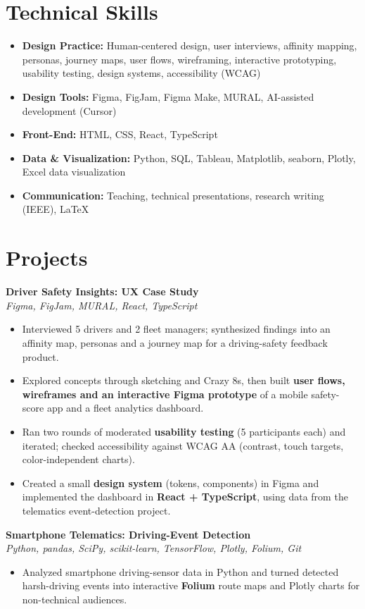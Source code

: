 \documentclass[10pt,letterpaper]{article}
\newcommand{\project}[2]{\textbf{#1}\\\textit{#2}\par}
\begin{document}
\section*{Technical Skills}
\begin{itemize}\item \textbf{Design Practice:} Human-centered design, user interviews, affinity mapping, personas, journey maps, user flows, wireframing, interactive prototyping, usability testing, design systems, accessibility (WCAG)\item \textbf{Design Tools:} Figma, FigJam, Figma Make, MURAL, AI-assisted development (Cursor)\item \textbf{Front-End:} HTML, CSS, React, TypeScript\item \textbf{Data \& Visualization:} Python, SQL, Tableau, Matplotlib, seaborn, Plotly, Excel data visualization\item \textbf{Communication:} Teaching, technical presentations, research writing (IEEE), LaTeX\end{itemize}
\section*{Projects}
\project{Driver Safety Insights: UX Case Study}{Figma, FigJam, MURAL, React, TypeScript}
\begin{itemize}\item Interviewed 5 drivers and 2 fleet managers; synthesized findings into an affinity map, personas and a journey map for a driving-safety feedback product.\item Explored concepts through sketching and Crazy 8s, then built \textbf{user flows, wireframes and an interactive Figma prototype} of a mobile safety-score app and a fleet analytics dashboard.\item Ran two rounds of moderated \textbf{usability testing} (5 participants each) and iterated; checked accessibility against WCAG AA (contrast, touch targets, color-independent charts).\item Created a small \textbf{design system} (tokens, components) in Figma and implemented the dashboard in \textbf{React + TypeScript}, using data from the telematics event-detection project.\end{itemize}\vspace{2pt}
\project{Smartphone Telematics: Driving-Event Detection}{Python, pandas, SciPy, scikit-learn, TensorFlow, Plotly, Folium, Git}
\begin{itemize}\item Analyzed smartphone driving-sensor data in Python and turned detected harsh-driving events into interactive \textbf{Folium} route maps and Plotly charts for non-technical audiences.\end{itemize}\vspace{2pt}
\end{document}
